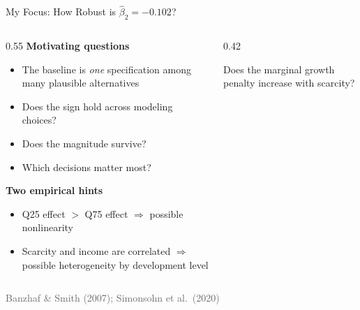 \documentclass[aspectratio=169,12pt]{beamer}
\newcommand{\source}[1]{\vfill\hfill{\tiny\textcolor{dimgray}{#1}}}
\begin{document}
\begin{frame}{My Focus: How Robust is $\hat{\beta}_2 = -0.102$?}

\begin{columns}[T]
\begin{column}{0.55\textwidth}
\textbf{Motivating questions}
\begin{itemize}
    \item The baseline is \emph{one} specification among many plausible alternatives
    \item Does the sign hold across modeling choices?
    \item Does the magnitude survive?
    \item Which decisions matter most?
\end{itemize}

\vspace{0.3cm}
\textbf{Two empirical hints}
\begin{itemize}
    \item Q25 effect $>$ Q75 effect $\Rightarrow$ possible \alert{nonlinearity}
    \item Scarcity and income are correlated $\Rightarrow$ possible \alert{heterogeneity} by development level
\end{itemize}
\end{column}

\begin{column}{0.42\textwidth}
\vspace{0.3cm}
\centering
{}

\vspace{0.3cm}
{\footnotesize Does the marginal growth penalty increase with scarcity?}
\end{column}
\end{columns}

\source{Banzhaf \& Smith (2007); Simonsohn et al.\ (2020)}
\end{frame}
\end{document}
